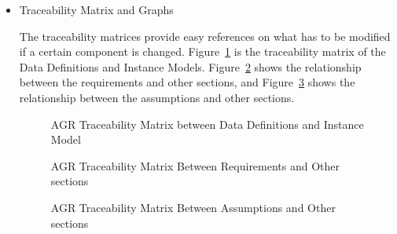 \begin{itemize}
\item Traceability Matrix and Graphs

The traceability matrices provide easy references on what has to be modified if a certain component is changed. Figure~\ref{fig_agr_tm_dd_im} is the traceability matrix of the Data Definitions and Instance Models. Figure~\ref{fig_agr_tm_im_r} shows the relationship between the requirements and other sections, and Figure~\ref{fig_agr_tm_a} shows the relationship between the assumptions and other sections.
\begin{figure}[H]
    \centering
    \caption[AGR Traceability Matrix between Data Definitions and Instance Model]{AGR Traceability Matrix between Data Definitions and Instance Model}
    \label{fig_agr_tm_dd_im}
\end{figure}

\begin{figure}[H]
    \centering
    \caption[AGR Traceability Matrix Between Requirements and Other sections]{AGR Traceability Matrix Between Requirements and Other sections}
    \label{fig_agr_tm_im_r}
\end{figure}

\begin{figure}[H]
    \centering
    \caption[AGR Traceability Matrix Between Assumptions and Other sections]{AGR Traceability Matrix Between Assumptions and Other sections}
    \label{fig_agr_tm_a}
\end{figure}


\end{itemize}
